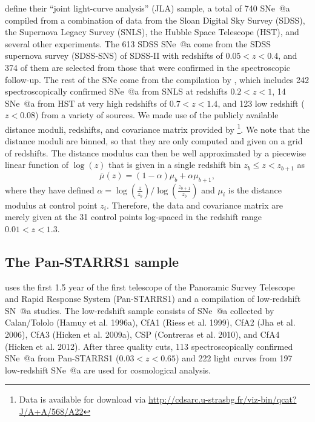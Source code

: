 \documentclass[12pt,a4paper]{article}
\makeatletter
\newcommand*{\rom}[1]{\expandafter\@slowromancap\romannumeral #1@}
\newcommand{\sne}{\mbox{SNe}}
\newcommand{\sna}{\mbox{SN \rom{1}a}}
\newcommand{\snea}{\mbox{SNe \rom{1}a}}
\makeatother
\begin{document}
\citet{betoule2014} define their ``joint light-curve analysis'' (JLA) 
sample, a total of 740 \snea{} compiled from a combination of 
data from the Sloan Digital Sky 
Survey (SDSS), the Supernova Legacy Survey (SNLS), the Hubble Space 
Telescope (HST), and several other experiments. The 613 SDSS \snea{} 
come from the SDSS supernova survey (SDSS-SNS) of SDSS-II \citep{sako2014} 
with redshifts of $0.05 < z < 0.4$, and 374 of them are selected from those 
that were confirmed in the spectroscopic follow-up. The rest of the 
\sne{} come from the compilation by \citet{conley2011}, which includes 
242 spectroscopically confirmed \snea{} from SNLS at redshifts $0.2 < z < 1$, 
14 \snea{} from HST at very high redshifts of $0.7 < z < 1.4$, and 123 
low redshift ($z < 0.08$) from a variety of sources. We made use of the 
publicly available distance moduli, redshifts, and covariance 
matrix provided by \citet{betoule2014}\footnote{Data is available 
for download via 
\url{http://cdsarc.u-strasbg.fr/viz-bin/qcat?J/A+A/568/A22}}. 
We note that the distance moduli are binned, so that they are only computed and 
given on a grid of redshifts. The distance modulus can then be well 
approximated by a piecewise linear function of $\log(z)$ that is given 
in a single redshift bin $z_b \le z < z_{b+1}$ as 
\citep[see][Appendix E.1]{betoule2014}
\begin{equation}
\label{eq:binnedMu}
\bar{\mu}(z) = (1 - \alpha) \mu_b + \alpha \mu_{b+1},
\end{equation}
where they have defined 
$\alpha = \log\left(\frac{z}{z_b}\right)/\log\left(\frac{z_{b+1}}{z_b}\right)$ 
and $\mu_i$ is the distance modulus at control point $z_i$. 
Therefore, the data and covariance matrix are merely given at the 
31 control points log-spaced in the redshift range $0.01 < z < 1.3$.

\subsection{The Pan-STARRS1 sample}
\label{sec:rest}

\citet{rest2014} uses the first 1.5 year of the first telescope of 
the Panoramic Survey Telescope and Rapid Response System (Pan-STARRS1) 
and a compilation of low-redshift {\sna} studies. The low-redshift 
sample consists of {\snea} collected by Calan/Tololo (Hamuy et al. 1996a), 
CfA1 (Riess et al. 1999), CfA2 (Jha et al. 2006), CfA3 (Hicken et al. 2009a), 
CSP (Contreras et al. 2010), and CfA4 (Hicken et al. 2012). After 
three quality cuts, 113 spectroscopically confirmed {\snea} from 
Pan-STARRS1 ($0.03 < z < 0.65$) and 222 light curves from 197 
low-redshift {\snea} are used for cosmological analysis. 
\end{document}
